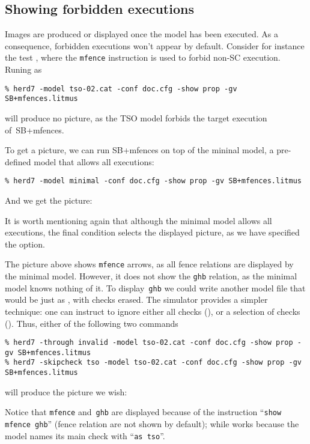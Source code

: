 \subsection{\label{show:forbidden}Showing forbidden executions}
Images are produced or displayed once the model has been executed.
As a consequence,
forbidden executions won't appear by default.
Consider for instance the test ,
where the \texttt{mfence} instruction is used to forbid
 non-SC execution. Runing \herd{} as
\begin{verbatim}
% herd7 -model tso-02.cat -conf doc.cfg -show prop -gv SB+mfences.litmus
\end{verbatim}
will produce no picture, as the TSO model forbids the target execution
of~\textsf{SB+mfences}.

To get a picture, we can run \textsf{SB+mfences} on top of the mininal
model, a pre-defined model that allows all executions:
\begin{verbatim}
% herd7 -model minimal -conf doc.cfg -show prop -gv SB+mfences.litmus
\end{verbatim}
And we get the picture:
\begin{center}\end{center}
It is worth mentioning again  that although the minimal model allows all
executions, the final condition
selects the displayed picture, as we have specified the
 option.


\label{name:check}The picture above shows \verb+mfence+ arrows, as all
fence relations are displayed by the minimal model.
However, it  does not show the \verb+ghb+ relation, as the minimal
model knows nothing of it.
To display~\verb+ghb+ we could write another model file that would be just as
, with checks erased.
The simulator \herd{} provides a simpler technique:
one can instruct \herd{} to ignore
either all checks (), or a selection of checks
().
Thus, either of the following two commands
\begin{verbatim}
% herd7 -through invalid -model tso-02.cat -conf doc.cfg -show prop -gv SB+mfences.litmus
% herd7 -skipcheck tso -model tso-02.cat -conf doc.cfg -show prop -gv SB+mfences.litmus
\end{verbatim}
will produce the picture we wish:
\begin{center}\end{center}
Notice that \verb+mfence+ and~\verb+ghb+ are displayed because
of the instruction ``\verb+show mfence ghb+'' (fence relation are not shown
by default);
while  works because the  model
names its main check with ``\verb+as tso+''.

